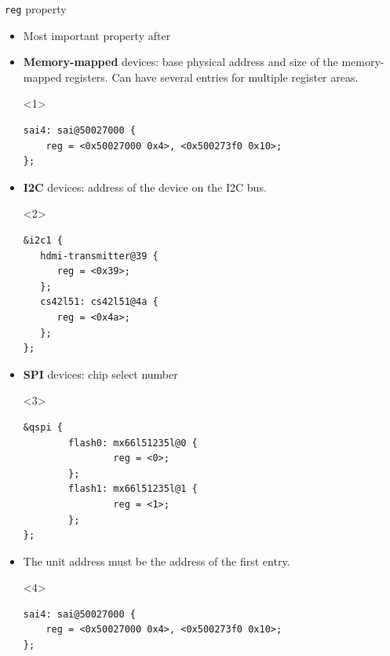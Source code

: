 \begin{frame}[fragile]{{\tt reg} property}
  \begin{itemize}
  \item Most important property after 
  \item {\bf Memory-mapped} devices: base physical address and size of
    the memory-mapped registers. Can have several entries for multiple
    register areas.
\begin{onlyenv}<1>
\begin{block}{}
\begin{verbatim}
sai4: sai@50027000 {
    reg = <0x50027000 0x4>, <0x500273f0 0x10>;
};
\end{verbatim}
\end{block}
\end{onlyenv}
\pause
  \item {\bf I2C} devices: address of the device on the I2C bus.
\begin{onlyenv}<2>
\begin{block}{}
\begin{verbatim}
&i2c1 {
   hdmi-transmitter@39 {
      reg = <0x39>;
   };
   cs42l51: cs42l51@4a {
      reg = <0x4a>;
   };
};
\end{verbatim}
\end{block}
\end{onlyenv}
\pause
  \item {\bf SPI} devices: chip select number
\begin{onlyenv}<3>
\begin{block}{}
\begin{verbatim}
&qspi {
        flash0: mx66l51235l@0 {
                reg = <0>;
        };
        flash1: mx66l51235l@1 {
                reg = <1>;
        };
};
\end{verbatim}
\end{block}
\end{onlyenv}
\pause
\item The unit address must be the address of the first 
  entry.
\begin{onlyenv}<4>
\begin{block}{}
\begin{verbatim}
sai4: sai@50027000 {
    reg = <0x50027000 0x4>, <0x500273f0 0x10>;
};
\end{verbatim}
\end{block}
\end{onlyenv}
  \end{itemize}
\end{frame}

